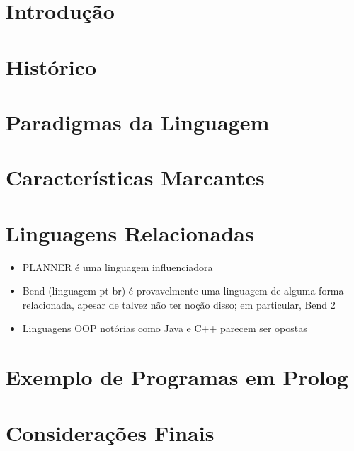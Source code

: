 \documentclass[
    12pt,
    openright,
    a4paper,
    brazil
]{abntex2}
\begin{document}
\imprimirfolhaderosto*

\tableofcontents*
\cleardoublepage


\textual
\chapter{Introdução}


\chapter{Histórico}


\chapter{Paradigmas da Linguagem}


\chapter{Características Marcantes}



\chapter{Linguagens Relacionadas}
\begin{itemize}
    \item PLANNER é uma linguagem influenciadora 
    \item Bend (linguagem pt-br) é provavelmente uma linguagem de alguma forma
    relacionada, apesar de talvez não ter noção disso; em particular, Bend 2
    \item Linguagens OOP notórias como Java e C++ parecem ser opostas
\end{itemize}

\chapter{Exemplo de Programas em Prolog}

\chapter{Considerações Finais}


\postextual

\end{document}
